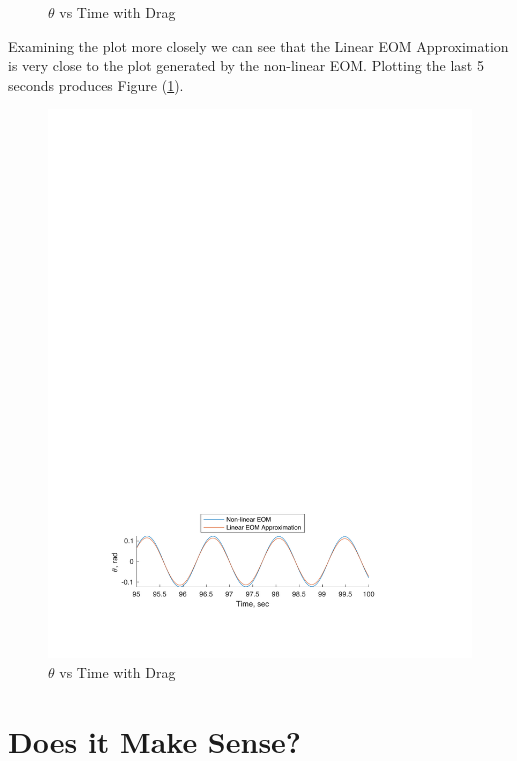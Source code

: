 \documentclass[12pt]{report}
\begin{document}
\begin{flushleft}
\begin{figure}[ht]
  \caption{$\theta$ vs Time with Drag}
\end{figure}
Examining the plot more closely we can see that the Linear EOM Approximation is very close to the plot generated by the non-linear EOM. Plotting the last 5 seconds produces Figure (\ref{fig:timewithdrag}).
\begin{figure}[ht]
  \includegraphics[center]{compareclose}
  \caption{$\theta$ vs Time with Drag}
  \label{fig:timewithdrag}
\end{figure}
\newpage
\section{Does it Make Sense?}

\end{flushleft}
\end{document}
